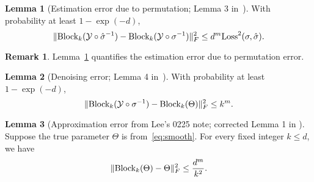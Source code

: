 \documentclass[10pt]{article}
\theoremstyle{definition}
\newtheorem{lem}{Lemma}
\theoremstyle{definition}
\newtheorem{rmk}{Remark}
\theoremstyle{definition}
\begin{document}
\begin{lem}[Estimation error due to permutation; Lemma 3 in~\cite{chan2014consistent}]\label{lem:step1est}With probability at least $1-\exp(-d)$, 
\[
\lVert\text{Block}_k(\mathcal{Y}\circ \hat \sigma^{-1}) - \text{Block}_k(\mathcal{Y}\circ \sigma^{-1})\rVert_F^2 \leq d^m \text{Loss}^2(\sigma, \hat \sigma).
\]
\end{lem}

\begin{rmk} 
Lemma~\ref{lem:step1est} quantifies the estimation error due to permutation error.
\end{rmk}

\begin{lem}[Denoising error; Lemma 4 in~\cite{chan2014consistent}]\label{lem:noise}With probability at least $1-\exp(-d)$,
\[
\lVert\text{Block}_k(\mathcal{Y}\circ \sigma^{-1})-\text{Block}_k(\Theta)\rVert_F^2 \leq k^m. 
\]
\end{lem}

\begin{lem}[Approximation error from Lee's 0225 note; corrected Lemma 1 in \cite{chan2014consistent}]\label{lem:a}Suppose the true parameter $\Theta$ is from~\eqref{eq:smooth}. For every fixed integer $k\leq d$, we have
\[
\lVert\text{Block}_k(\Theta)-\Theta\rVert_F^2 \leq {d^m\over k^2}.
\]
\end{lem}
\end{document}
